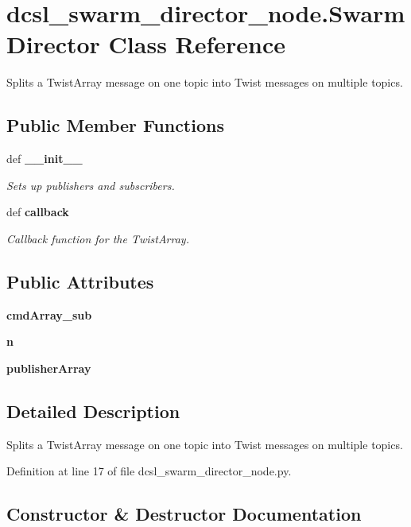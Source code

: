 \section{dcsl\-\_\-swarm\-\_\-director\-\_\-node.\-Swarm\-Director \-Class \-Reference}
\label{classdcsl__swarm__director__node_1_1SwarmDirector}


\-Splits a \-Twist\-Array message on one topic into \-Twist messages on multiple topics.  


\subsection*{\-Public \-Member \-Functions}
\begin{DoxyCompactItemize}
\item 
def {\bf \-\_\-\-\_\-init\-\_\-\-\_\-}
\begin{DoxyCompactList}\small\item\em \-Sets up publishers and subscribers. \end{DoxyCompactList}\item 
def {\bf callback}
\begin{DoxyCompactList}\small\item\em \-Callback function for the \-Twist\-Array. \end{DoxyCompactList}\end{DoxyCompactItemize}
\subsection*{\-Public \-Attributes}
\begin{DoxyCompactItemize}
\item 
{\bf cmd\-Array\-\_\-sub}
\item 
{\bf n}
\item 
{\bf publisher\-Array}
\end{DoxyCompactItemize}


\subsection{\-Detailed \-Description}
\-Splits a \-Twist\-Array message on one topic into \-Twist messages on multiple topics. 

\-Definition at line 17 of file dcsl\-\_\-swarm\-\_\-director\-\_\-node.\-py.



\subsection{\-Constructor \& \-Destructor \-Documentation}
